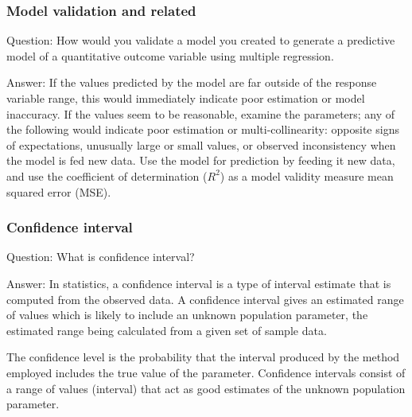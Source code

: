 \documentclass[11pt]{beamer}
\begin{document}
\begin{frame}
\frametitle{Model validation and related}
\begin{block}{Question:}
	How would you validate a model you created to generate a predictive model of a quantitative outcome variable using multiple regression.
\end{block}
\begin{block}{Answer:}
	If the values predicted by the model are far outside of the response variable range, this would immediately indicate poor estimation or model inaccuracy. If the values seem to be reasonable, examine the parameters; any of the following would indicate poor estimation or multi-collinearity: opposite signs of expectations, unusually large or small values, or observed inconsistency when the model is fed new data. Use the model for prediction by feeding it new data, and use the coefficient of determination ($R^2$) as a model validity measure mean squared error (MSE).
\end{block}
\end{frame}

\begin{frame}
\frametitle{Confidence interval}
\begin{block}{Question:}
	What is confidence interval?
\end{block}
\begin{block}{Answer:}
	In statistics, a confidence interval is a type of interval estimate that is computed from the observed data. A confidence interval gives an estimated range of values which is likely to include an unknown population parameter, the estimated range being calculated from a given set of sample data.
	
	The confidence level is the probability that the interval produced by the method employed includes the true value of the parameter. Confidence intervals consist of a range of values (interval) that act as good estimates of the unknown population parameter.
\end{block}
\end{frame}
\end{document}
